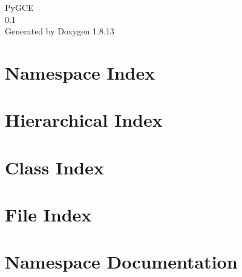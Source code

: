\documentclass[twoside]{book}
\newcommand{\+}{\discretionary{\mbox{\scriptsize$\hookleftarrow$}}{}{}}
\newcommand{\clearemptydoublepage}{%
  \newpage{\pagestyle{empty}\cleardoublepage}%
}
\begin{document}
\hypersetup{pageanchor=false,
             bookmarksnumbered=true,
             pdfencoding=unicode
            }
\begin{titlepage}
\vspace*{7cm}
\begin{center}%
{\Large Py\+G\+CE \\[1ex]\large 0.\+1 }\\
\vspace*{1cm}
{\large Generated by Doxygen 1.8.13}\\
\end{center}
\end{titlepage}
\clearemptydoublepage
{}
\tableofcontents
\clearemptydoublepage
{}
\hypersetup{pageanchor=true}

\chapter{Namespace Index}

\chapter{Hierarchical Index}

\chapter{Class Index}

\chapter{File Index}

\chapter{Namespace Documentation}











\end{document}
